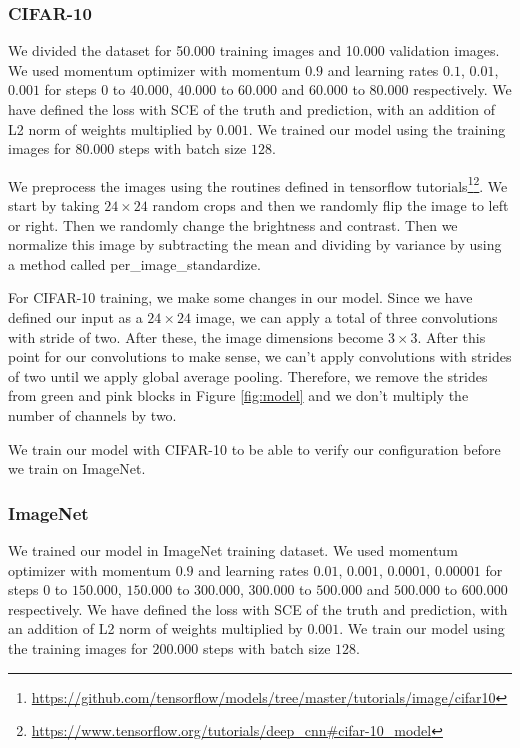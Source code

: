 \subsubsection{CIFAR-10}
We divided the dataset for 50.000 training images and 10.000 validation images. We used momentum optimizer with momentum $0.9$ and learning rates $0.1$, $0.01$, $0.001$ for steps $0$ to $40.000$, $40.000$ to $60.000$ and $60.000$ to $80.000$ respectively. We have defined the loss with SCE of the truth and prediction, with an addition of L2 norm of weights multiplied by $0.001$. We trained our model using the training images for $80.000$ steps with batch size $128$. 

We preprocess the images using the routines defined in tensorflow tutorials\footnote{\url{https://github.com/tensorflow/models/tree/master/tutorials/image/cifar10}}\footnote{\url{https://www.tensorflow.org/tutorials/deep\_cnn\#cifar-10\_model}}. We start by taking $24 \times 24$ random crops and then we randomly flip the image to left or right. Then we randomly change the brightness and contrast. Then we normalize this image by subtracting the mean and dividing by variance by using a method called per\_image\_standardize.

For CIFAR-10 training, we make some changes in our model. Since we have defined our input as a $24 \times 24$ image, we can apply a total of three convolutions with stride of two. After these, the image dimensions become $3 \times 3$. After this point for our convolutions to make sense, we can't apply convolutions with strides of two until we apply global average pooling. Therefore, we remove the strides from green and pink blocks in Figure \ref{fig:model} and we don't multiply the number of channels by two. 

We train our model with CIFAR-10 to be able to verify our configuration before we train on ImageNet. 

\subsubsection{ImageNet}
We trained our model in ImageNet training dataset. We used momentum optimizer with momentum $0.9$ and learning rates $0.01$, $0.001$, $0.0001$, $0.00001$ for steps $0$ to $150.000$, $150.000$ to $300.000$, $300.000$ to $500.000$ and $500.000$ to $600.000$ respectively. We have defined the loss with SCE of the truth and prediction, with an addition of L2 norm of weights multiplied by $0.001$. We train our model using the training images for $200.000$ steps with batch size $128$.

